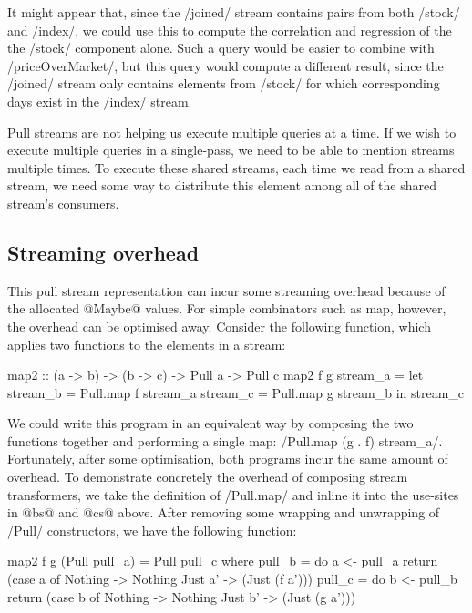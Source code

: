 It might appear that, since the \Hs/joined/ stream contains pairs from both \Hs/stock/ and \Hs/index/, we could use this to compute the correlation and regression of the the \Hs/stock/ component alone.
Such a query would be easier to combine with \Hs/priceOverMarket/, but this query would compute a different result, since the \Hs/joined/ stream only contains elements from \Hs/stock/ for which corresponding days exist in the \Hs/index/ stream.

Pull streams are not helping us execute multiple queries at a time.
If we wish to execute multiple queries in a single-pass, we need to be able to mention streams multiple times.
To execute these shared streams, each time we read from a shared stream, we need some way to distribute this element among all of the shared stream's consumers.

\subsection{Streaming overhead}
\label{taxonomy/pull/streaming-overhead}

This pull stream representation can incur some streaming overhead because of the allocated @Maybe@ values.
For simple combinators such as map, however, the overhead can be optimised away.
Consider the following function, which applies two functions to the elements in a stream:

\begin{haskell}
map2 :: (a -> b) -> (b -> c) -> Pull a -> Pull c
map2 f g stream_a
 = let stream_b = Pull.map f stream_a
       stream_c = Pull.map g stream_b
   in  stream_c
\end{haskell}

We could write this program in an equivalent way by composing the two functions together and performing a single map: \Hs/Pull.map (g . f) stream_a/.
Fortunately, after some optimisation, both programs incur the same amount of overhead.
To demonstrate concretely the overhead of composing stream transformers, we take the definition of \Hs/Pull.map/ and inline it into the use-sites in @bs@ and @cs@ above.
After removing some wrapping and unwrapping of \Hs/Pull/ constructors, we have the following function:

\begin{haskell}
map2 f g (Pull pull_a) = Pull pull_c
 where
  pull_b = do
    a <- pull_a
    return (case a of
             Nothing -> Nothing
             Just a' -> (Just (f a')))
  pull_c = do
    b <- pull_b
    return (case b of
             Nothing -> Nothing
             Just b' -> (Just (g a')))
\end{haskell}

